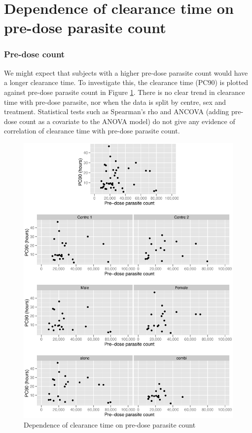\section{Dependence of clearance time on pre-dose parasite count}
\subsubsection*{Pre-dose count}\label{sec:predoseancova}
We might expect that subjects with a higher pre-dose parasite count would have a longer clearance time. To investigate this, the clearance time (PC90) is plotted against pre-dose parasite count in Figure \ref{predose-ancova}. There is no clear trend in clearance time with pre-dose parasite, nor when the data is split by centre, sex and treatment. Statistical tests such as Spearman's rho and ANCOVA (adding pre-dose count as a covariate to the ANOVA model) do not give any evidence of correlation of clearance time with pre-dose parasite count.
\begin{figure}[p]
\includegraphics[width=150mm]{predose-ancova.eps} 
\caption{Dependence of clearance time on pre-dose parasite count}
\label{predose-ancova}
\end{figure}

